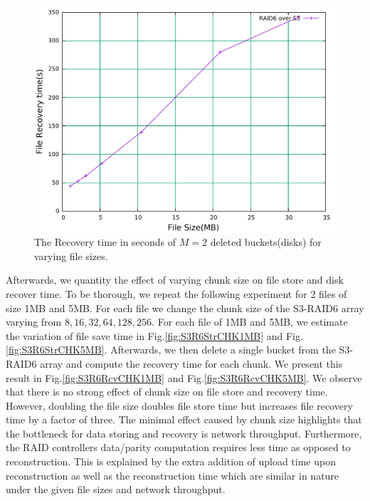 \begin{figure}[h!]
\includegraphics[width=\linewidth]{figures/S3RAIDRecoveryTime.pdf}
\centering
\caption{The Recovery time in seconds of $M=2$ deleted buckets(disks) for varying file sizes.}
\label{fig:S3R6Rcv}
\end{figure}

Afterwards, we quantity the effect of varying chunk size on file store and disk recover time.
To be thorough, we repeat the following experiment for 2 files of size 1MB and 5MB.
For each file we change the chunk size of the S3-RAID6 array varying from $8, 16, 32, 64, 128, 256$. For each file of 1MB and 5MB, we estimate the variation of file save time in Fig.\ref{fig:S3R6StrCHK1MB} and Fig.\ref{fig:S3R6StrCHK5MB}.
Afterwards, we then delete a single bucket from the S3-RAID6 array and compute the recovery time for each chunk.
We present this result in Fig.\ref{fig:S3R6RcvCHK1MB} and Fig.\ref{fig:S3R6RcvCHK5MB}. 
We observe that there is no strong effect of chunk size on file store and recovery time.
However, doubling the file size doubles file store time but increases file recovery time by a factor of three.
The minimal effect caused by chunk size highlights that the bottleneck for data storing and recovery is network throughput.
Furthermore, the RAID controllers data/parity computation requires less time as opposed to reconstruction.
This is explained by the extra addition of upload time upon reconstruction as well as the reconstruction time which are similar in nature under the given file sizes and network throughput.

